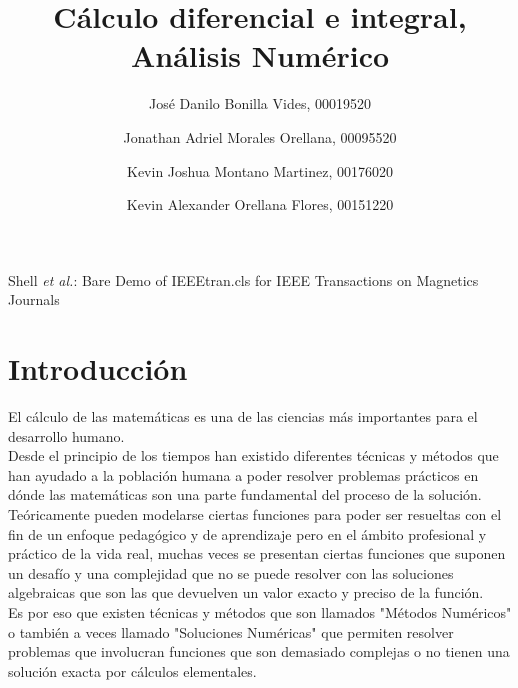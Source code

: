 \documentclass[journal,transmag]{IEEEtran}
\theoremstyle{mytheoremstyle}
\theoremstyle{mytheoremstyle}
\theoremstyle{myproblemstyle}
\begin{document}
\title{Cálculo diferencial e integral, Análisis Numérico}
\author{José Danilo Bonilla Vides, 00019520}
\author{Jonathan Adriel Morales Orellana, 00095520}
\author{Kevin Joshua Montano Martinez, 00176020}
\author{Kevin Alexander Orellana Flores, 00151220}
%
{Shell \MakeLowercase{\textit{et al.}}: Bare Demo of IEEEtran.cls for IEEE Transactions on Magnetics Journals}


\maketitle

\IEEEdisplaynontitleabstractindextext

\IEEEpeerreviewmaketitle

\section{Introducción}
El cálculo de las matemáticas es una de las ciencias más importantes para el desarrollo humano. \\
Desde el principio de los tiempos han existido diferentes técnicas y métodos que han ayudado 
a la población humana a poder resolver problemas prácticos en dónde las matemáticas son una parte
fundamental del proceso de la solución. \\

Teóricamente pueden modelarse ciertas funciones para poder ser resueltas con el fin de un enfoque pedagógico y de aprendizaje
pero en el ámbito profesional y práctico de la vida real, muchas veces se presentan ciertas funciones 
que suponen un desafío y una complejidad que no se puede resolver con las soluciones algebraicas que son
las que devuelven un valor exacto y preciso de la función. \\

Es por eso que existen técnicas y métodos que son llamados "Métodos Numéricos" o también a veces llamado "Soluciones Numéricas" 
que permiten resolver problemas que involucran funciones que son demasiado complejas
o no tienen una solución exacta por cálculos elementales. \\
\end{document}
